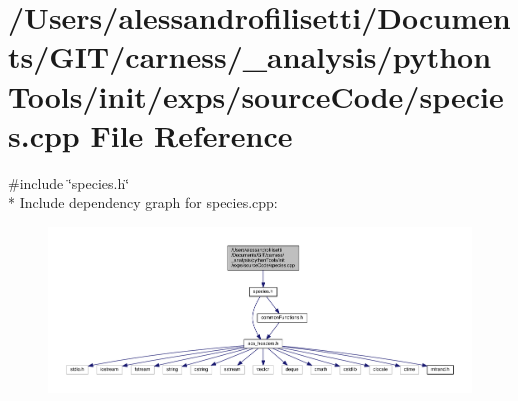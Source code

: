 \hypertarget{a00078}{\section{/\+Users/alessandrofilisetti/\+Documents/\+G\+I\+T/carness/\+\_\+analysis/python\+Tools/init/exps/source\+Code/species.cpp File Reference}
\label{a00078}
}
{\ttfamily \#include \char`\"{}species.\+h\char`\"{}}\\*
Include dependency graph for species.\+cpp\+:\nopagebreak
\begin{figure}[H]
\begin{center}
\leavevmode
\includegraphics[width=350pt]{a00202}
\end{center}
\end{figure}
